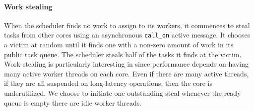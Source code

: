 % 
% 
% 






\paragraph{Work stealing} 
When the scheduler finds no work to assign to its workers, it commences to
steal tasks from other cores using an asynchronous \texttt{call\_on} active
message. It chooses a victim at random until it finds one with a non-zero
amount of work in its public task queue. The scheduler steals half of the
tasks it finds at the victim. Work stealing is particularly interesting in
\Grappa since performance depends on having many active worker threads on each
core. Even if there are many active threads, if they are all suspended on
long-latency operations, then the core is underutilized. We choose to initiate
one outstanding steal whenever the ready queue is empty there are idle worker
threads.

